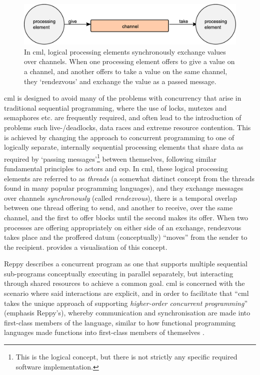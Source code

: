\begin{figure}
    \centering
    \includegraphics[width=\textwidth]{chapters/background/images/cml_exchange.eps}
    \caption[Diagram of the message-passing primitive in ]{In \gls{cml}, logical processing elements synchronously exchange values over channels.  When one processing element offers to give a value on a channel, and another offers to take a value on the same channel, they ‘rendezvous’ and exchange the value as a passed message.}
    \label{fig:back:cml_exchange}
\end{figure}

\Gls{cml} is designed to avoid many of the problems with concurrency that arise in traditional sequential programming, where the use of locks, mutexes and semaphores etc. are frequently required, and often lead to the introduction of problems such live-/deadlocks, data races and extreme resource contention.  This is achieved by changing the approach to concurrent programming to one of logically separate, internally sequential processing elements that share data as required by `passing messages'\footnote{This is the logical concept, but there is not strictly any specific required software implementation.} between themselves, following similar fundamental principles to \glspl{actor} and \gls{csp}.  In \gls{cml}, these logical processing elements are referred to as \emph{threads} (a somewhat distinct concept from the threads found in many popular programming languages), and they exchange messages over channels \emph{synchronously} (called \emph{rendezvous}), \ie{} there is a temporal overlap between one thread offering to send, and another to receive, over the same channel, and the first to offer blocks until the second makes its offer.  When two processes are offering appropriately on either side of an exchange, rendezvous takes place and the proffered datum (conceptually) ``moves'' from the sender to the recipient.   provides a visualisation of this concept.

Reppy describes a concurrent program as one that supports multiple sequential sub-programs conceptually executing in parallel separately, but interacting through shared resources to achieve a common goal.  \Gls{cml} is concerned with the scenario where said interactions are explicit, and in order to facilitate that \enquote{\gls{cml} takes the unique approach of supporting \emph{higher-order concurrent programming}} (emphasis Reppy's), whereby communication and synchronisation are made into first-class members of the language, similar to how functional programming languages made functions into first-class members of themselves \cite[Preface]{Reppy2007}.
